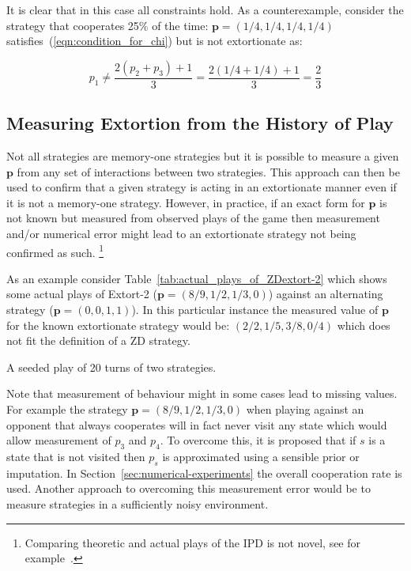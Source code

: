 \documentclass[a4paper]{article}
\begin{document}
It is clear that in this case all constraints hold. As a counterexample,
consider the strategy that cooperates 25\% of the time: \(\textbf{p}=(1 /4, 1 / 4, 1 / 4,
1 / 4)\) satisfies~(\ref{eqn:condition_for_chi}) but is not extortionate as:

\begin{equation}
    p_1 \ne \frac{2(p_2 + p_3) + 1}{3}
        = \frac{2(1 / 4 + 1 / 4) + 1}{3}
        = \frac{2}{3}
\end{equation}

\subsection{Measuring Extortion from the History of Play}

Not all strategies are memory-one strategies but it is possible to
measure a given \(\textbf{p}\) from any set of interactions between two strategies.
This approach can then be used to confirm that a given strategy is acting
in an extortionate manner even if it is not a memory-one strategy. However, in
practice, if an exact form for \(\textbf{p}\) is not known but measured from observed
plays of the game then measurement and/or numerical error might lead to an
extortionate strategy not being confirmed as such. \footnote{Comparing theoretic
and actual plays of the IPD is not novel, see for example~\cite{Rand2013}.}


As an example consider Table~\ref{tab:actual_plays_of_ZDextort-2} which shows
some actual plays of Extort-2 (\(\textbf{p}=(8 / 9, 1 / 2, 1 / 3, 0)\)) against an
alternating strategy (\(\textbf{p}=(0, 0, 1, 1)\)). In this particular instance the
measured value of \(\textbf{p}\) for the known extortionate strategy would be:
\((2/2, 1/5, 3/8, 0/4)\) which does not fit the definition of a ZD strategy.


\begin{table}[!hbtp]
    
    \caption{A seeded play of 20 turns of two strategies.}
    \label{tab:actual_plays_of_ZDextort-2}
\end{table}


Note that measurement of behaviour might in some cases lead to missing values.
For example the strategy \(\textbf{p}=(8 / 9, 1 / 2, 1 / 3, 0)\) when playing against an
opponent that always cooperates will in fact never visit any state which would allow measurement
of \(p_3\) and \(p_4\). To overcome this, it is proposed that if \(s\) is a state
that is not visited then \(p_s\) is approximated using a sensible prior or
imputation. In Section~\ref{sec:numerical-experiments} the overall cooperation
rate is used. Another approach to overcoming this measurement error would be to
measure strategies in a sufficiently noisy environment.
\end{document}
